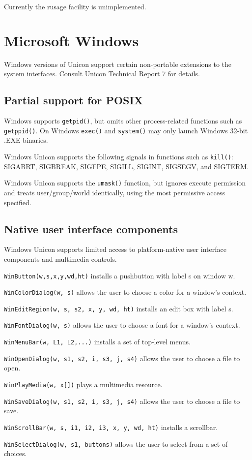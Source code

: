 \noindent
Currently the \textsf{rusage} facility is unimplemented.


\section{Microsoft Windows}

Windows versions of Unicon support certain non-portable extensions to
the system interfaces. Consult Unicon Technical Report 7 for details.

\subsection*{Partial support for POSIX}

Windows supports \texttt{getpid()}, but omits other
process-related functions such as \texttt{getppid()}. On Windows
\texttt{exec()} and \texttt{system()} may only launch Windows 32-bit
.EXE binaries.

Windows Unicon supports the following signals in functions such as
\texttt{kill()}: SIGABRT, SIGBREAK, SIGFPE, SIGILL, SIGINT, SIGSEGV, and
SIGTERM.

Windows Unicon supports the \texttt{umask()} function, but ignores execute
permission and treats user/group/world identically, using the most
permissive access specified.

\subsection*{Native user interface components}

Windows Unicon supports limited access to platform-native user interface
components and multimedia controls.

\texttt{WinButton(w,s,x,y,wd,ht)} installs a pushbutton with label s on window w.

\texttt{WinColorDialog(w, s)} allows the user to choose a color for a
window's context.

\texttt{WinEditRegion(w, s, s2, x, y, wd, ht)} installs an edit box with label s.

\texttt{WinFontDialog(w, s)} allows the user to choose a font for a
window's context.

\texttt{WinMenuBar(w, L1, L2,...)} installs a set of top-level menus.

\texttt{WinOpenDialog(w, s1, s2, i, s3, j, s4)} allows the user to
 choose a file to open.

\texttt{WinPlayMedia(w, x[])} plays a multimedia resource.

\texttt{WinSaveDialog(w, s1, s2, i, s3, j, s4)} allows the user to
 choose a file to save.

\texttt{WinScrollBar(w, s, i1, i2, i3, x, y, wd, ht)} installs a scrollbar.

\texttt{WinSelectDialog(w, s1, buttons)} allows the user to select from a set of
choices.

